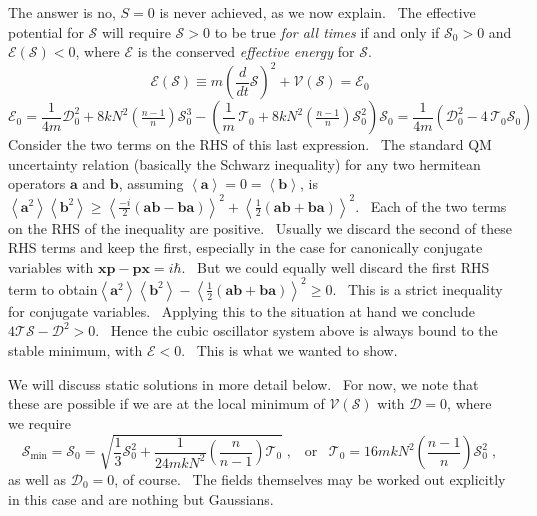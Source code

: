 \documentclass[a4paper,12pt]{article}%
\begin{document}
The answer is no, $S=0$ is never achieved, as we now explain. \ The effective
potential for $\mathcal{S}$ will require $\mathcal{S}>0$ to be true \emph{for
all times} if and only if $\mathcal{S}_{0}>0$ and $\mathcal{E}\left(
\mathcal{S}\right)  <0$, where $\mathcal{E}$ is the conserved \emph{effective
energy} for $\mathcal{S}$.
\[
\mathcal{E}\left(  \mathcal{S}\right)  \equiv m\left(  \frac{d}{dt}%
\mathcal{S}\right)  ^{2}+\mathcal{V}\left(  \mathcal{S}\right)  =\mathcal{E}%
_{0}%
\]%
\[
\mathcal{E}_{0}=\frac{1}{4m}\mathcal{D}_{0}^{2}+8kN^{2}\left(  \tfrac{n-1}%
{n}\right)  \mathcal{S}_{0}^{3}-\left(  \frac{1}{m}\,\mathcal{T}_{0}%
+8kN^{2}\left(  \tfrac{n-1}{n}\right)  \mathcal{S}_{0}^{2}\right)
\mathcal{S}_{0}=\frac{1}{4m}\left(  \mathcal{D}_{0}^{2}-4\,\mathcal{T}%
_{0}\mathcal{S}_{0}\right)
\]
Consider the two terms on the RHS of this last expression. \ The standard QM
uncertainty relation (basically the Schwarz inequality) for any two hermitean
operators $\mathbf{a}$ and $\mathbf{b}$, assuming $\left\langle \mathbf{a}%
\right\rangle =0=\left\langle \mathbf{b}\right\rangle $, is $\left\langle
\mathbf{a}^{2}\right\rangle \left\langle \mathbf{b}^{2}\right\rangle
\geq\left\langle \frac{-i}{2}\left(  \mathbf{ab}-\mathbf{ba}\right)
\right\rangle ^{2}+\left\langle \frac{1}{2}\left(  \mathbf{ab}+\mathbf{ba}%
\right)  \right\rangle ^{2}$. \ Each of the two terms on the RHS of the
inequality are positive. \ Usually we discard the second of these RHS terms
and keep the first, especially in the case for canonically conjugate variables
with $\mathbf{xp}-\mathbf{px}=i\hbar$. \ But we could equally well discard the
first RHS term to obtain$\left\langle \mathbf{a}^{2}\right\rangle \left\langle
\mathbf{b}^{2}\right\rangle -\left\langle \frac{1}{2}\left(  \mathbf{ab}%
+\mathbf{ba}\right)  \right\rangle ^{2}\geq0$. \ This is a strict inequality
for conjugate variables. \ Applying this to the situation at hand we conclude
$4\mathcal{TS}-\mathcal{D}^{2}>0$. \ Hence the cubic oscillator system above
is always bound to the stable minimum, with $\mathcal{E}<0$. \ This is what we
wanted to show.

We will discuss static solutions in more detail below. \ For now, we note that
these are possible if we are at the local minimum of $\mathcal{V}\left(
\mathcal{S}\right)  $ with $\mathcal{D}=0$, where we require
\[
\mathcal{S}_{\min}=\mathcal{S}_{0}=\sqrt{\frac{1}{3}\mathcal{S}_{0}%
^{2}+\frac{1}{24mkN^{2}}\left(  \frac{n}{n-1}\right)  \mathcal{T}_{0}%
}\;,\;\;\;\text{or}\;\;\;\mathcal{T}_{0}=16mkN^{2}\left(  \frac{n-1}%
{n}\right)  \mathcal{S}_{0}^{2}\;,
\]
as well as $\mathcal{D}_{0}=0$, of course. \ The fields themselves may be
worked out explicitly in this case and are nothing but Gaussians.
\end{document}
